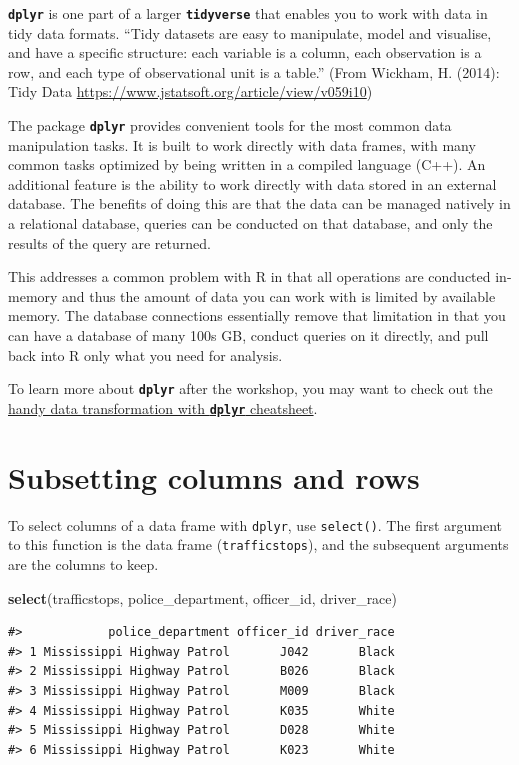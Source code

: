 \documentclass[]{book}
\newenvironment{Shaded}{\begin{snugshade}}{\end{snugshade}}
\newcommand{\KeywordTok}[1]{\textcolor[rgb]{0.13,0.29,0.53}{\textbf{#1}}}
\newcommand{\NormalTok}[1]{#1}
\theoremstyle{definition}
\theoremstyle{definition}
\theoremstyle{definition}
\theoremstyle{remark}
\begin{document}
\textbf{\texttt{dplyr}} is one part of a larger
\textbf{\texttt{tidyverse}} that enables you to work with data in tidy
data formats. ``Tidy datasets are easy to manipulate, model and
visualise, and have a specific structure: each variable is a column,
each observation is a row, and each type of observational unit is a
table.'' (From Wickham, H. (2014): Tidy Data
\url{https://www.jstatsoft.org/article/view/v059i10})

The package \textbf{\texttt{dplyr}} provides convenient tools for the
most common data manipulation tasks. It is built to work directly with
data frames, with many common tasks optimized by being written in a
compiled language (C++). An additional feature is the ability to work
directly with data stored in an external database. The benefits of doing
this are that the data can be managed natively in a relational database,
queries can be conducted on that database, and only the results of the
query are returned.

This addresses a common problem with R in that all operations are
conducted in-memory and thus the amount of data you can work with is
limited by available memory. The database connections essentially remove
that limitation in that you can have a database of many 100s GB, conduct
queries on it directly, and pull back into R only what you need for
analysis.

To learn more about \textbf{\texttt{dplyr}} after the workshop, you may
want to check out the
\href{https://github.com/rstudio/cheatsheets/raw/master/data-transformation.pdf}{handy
data transformation with \textbf{\texttt{dplyr}} cheatsheet}.

\section{Subsetting columns and rows}\label{subsetting-columns-and-rows}

To select columns of a data frame with \texttt{dplyr}, use
\texttt{select()}. The first argument to this function is the data frame
(\texttt{trafficstops}), and the subsequent arguments are the columns to
keep.

\begin{Shaded}
\begin{Highlighting}[]
\KeywordTok{select}\NormalTok{(trafficstops, police_department, officer_id, driver_race)}
\end{Highlighting}
\end{Shaded}

\begin{verbatim}
#>            police_department officer_id driver_race
#> 1 Mississippi Highway Patrol       J042       Black
#> 2 Mississippi Highway Patrol       B026       Black
#> 3 Mississippi Highway Patrol       M009       Black
#> 4 Mississippi Highway Patrol       K035       White
#> 5 Mississippi Highway Patrol       D028       White
#> 6 Mississippi Highway Patrol       K023       White
\end{verbatim}
\end{document}
